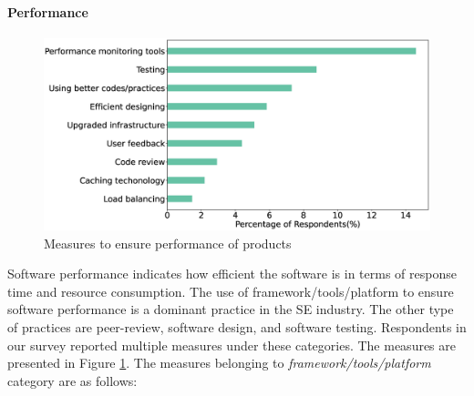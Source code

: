 

\paragraph{Performance}
\label{Performance}

\begin{figure}[h]
\centering
\includegraphics[scale=0.22]{Figures/Performance.eps} 
\caption{Measures to ensure performance of products}
\label{fig:Measures to ensure performance}
\end{figure}

Software performance indicates how efficient the software is in terms of response time and resource consumption. The use of framework/tools/platform to ensure software performance is a dominant practice in the SE industry. The other type of practices are peer-review, software design, and software testing. Respondents in our survey reported multiple measures under these categories.
The measures are presented in Figure \ref{fig:Measures to ensure performance}. The measures belonging to \emph{framework/tools/platform} category are as follows:

